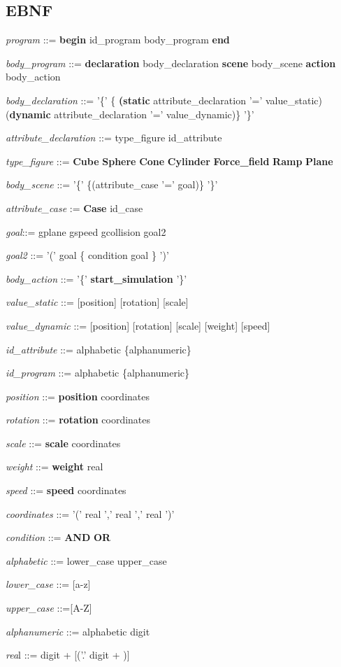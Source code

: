 \documentclass[12pt]{article}
\begin{document}
\subsection{EBNF}

\noindent \textit{program} ::= \textbf{begin} id\_program body\_program \textbf{end}

\noindent \textit{body\_program} ::= \textbf{declaration} body\_declaration \textbf{scene} body\_scene \textbf{action} body\_action

\noindent\textit{body\_declaration} ::= '\{' \{ \textbf{(static} attribute\_declaration '=' value\_static) \textbar (\textbf{dynamic} attribute\_declaration '=' value\_dynamic)\}  '\}'

\noindent \textit{attribute\_declaration} ::= type\_figure id\_attribute

\noindent \textit{type\_figure} ::= \textbf{Cube} \textbar \textbf{Sphere} \textbar \textbf{Cone} \textbar \textbf{Cylinder} \textbar \textbf{Force\_field} \textbar \textbf{Ramp} \textbar  \textbf{Plane}

\noindent \textit{body\_scene} ::= '\{' \{(attribute\_case '=' goal)\} '\}'

\noindent \textit{attribute\_case} := \textbf{Case} id\_case

\noindent \textit{goal}::=  gplane \textbar gspeed \textbar gcollision \textbar goal2

\noindent \textit{goal2} ::= '(' goal \{ condition goal \} ')'

\noindent \textit{body\_action} ::= '\{' \textbf{start\_simulation} '\}'

\noindent \textit{value\_static} ::= [position] [rotation] [scale]

\noindent \textit{value\_dynamic} ::= [position] [rotation] [scale] [weight] [speed]

\noindent \textit{id\_attribute} ::= alphabetic \{alphanumeric\}

\noindent \textit{id\_program} ::= alphabetic \{alphanumeric\}

\noindent \textit{position} ::= \textbf{position} coordinates

\noindent \textit{rotation} ::= \textbf{rotation} coordinates

\noindent \textit{scale} ::=  \textbf{scale} coordinates

\noindent \textit{weight} ::= \textbf{weight} real

\noindent \textit{speed} ::= \textbf{speed} coordinates

\noindent \textit{coordinates} ::= '(' real ',' real ','  real ')'

\noindent \textit{condition} ::= \textbf{AND} \textbar \textbf{OR}

\noindent \textit{alphabetic} ::= lower\_case  \textbar  upper\_case

\noindent \textit{lower\_case} ::= [a-z]

\noindent \textit{upper\_case} ::=[A-Z]

\noindent \textit{alphanumeric} ::= alphabetic \textbar digit

\noindent \textit{rea}l ::= digit + [('.' digit + )]
\end{document}
